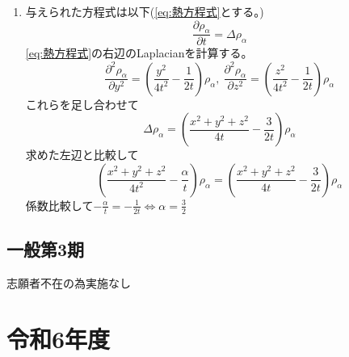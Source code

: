 \documentclass[dvipdfmx]{jsreport}
\newcounter{num}[section]
\begin{document}
\begin{answer}
\begin{enumerate}
	\item 与えられた方程式は以下(\eqref{eq:熱方程式}とする。)
\begin{equation} \tag{H}\label{eq:熱方程式}
	\frac{\partial \rho_\alpha}{\partial t}= \Delta\rho_\alpha
\end{equation}
	\eqref{eq:熱方程式}の右辺のLaplacianを計算する。
\begin{equation*}
	\frac{\partial^2 \rho_\alpha}{\partial y^2}= \left(\frac{y^2}{4t^2}- \frac{1}{2t}\right)\rho_\alpha,\ 
	\frac{\partial^2 \rho_\alpha}{\partial z^2}= \left(\frac{z^2}{4t^2}- \frac{1}{2t}\right)\rho_\alpha
\end{equation*}
	これらを足し合わせて
\begin{equation*}
	\Delta\rho_\alpha= \left(\frac{x^2+ y^2+ z^2}{4t}- \frac{3}{2t}\right)\rho_\alpha
\end{equation*}
	求めた左辺と比較して
\begin{equation*}
	\left(\frac{x^2+ y^2+ z^2}{4t^2}- \frac{\alpha}{t}\right)\rho_\alpha= \left(\frac{x^2+ y^2+ z^2}{4t}- \frac{3}{2t}\right)\rho_\alpha
\end{equation*}
	係数比較して$-\frac{\alpha}{t}= -\frac{1}{2t}\iff \alpha= \frac{3}{2}$

\end{enumerate}
\end{answer}

\section{一般第3期}
	志願者不在の為実施なし



\chapter{令和6年度}
\end{document}
